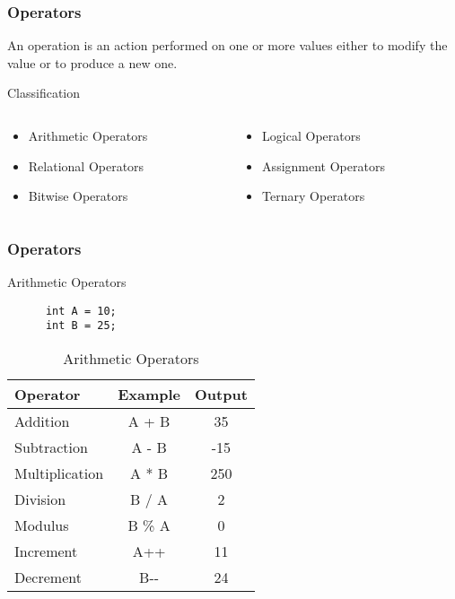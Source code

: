 \documentclass[10pt, compress]{beamer}
\begin{document}
\begin{frame}[fragile]
  \frametitle{Operators}
  An operation is an action performed on one or more values either to modify the value or to produce a new one.
  \begin{block}{Classification}
    \begin{columns}
      \begin{column}{0.5\textwidth}
        \begin{itemize}
          \item[] Arithmetic Operators
          \item[] Relational Operators
          \item[] Bitwise Operators
        \end{itemize}
      \end{column}
      \begin{column}{0.5\textwidth}
        \begin{itemize}
          \item[] Logical Operators
          \item[] Assignment Operators
          \item[] Ternary Operators
        \end{itemize}
      \end{column}
    \end{columns}
  \end{block}
\end{frame}

\begin{frame}[fragile]
  \frametitle{Operators}
  \begin{block}{Arithmetic Operators}
    \begin{verbatim}
      int A = 10;
      int B = 25;
    \end{verbatim}
    \begin{table}
      \begin{tabular}{lcc}
        \toprule
        Operator & Example & Output\\
        \midrule
        Addition & A + B & 35 \\
        Subtraction & A - B & -15\\
        Multiplication & A * B & 250\\
        Division & B / A & 2\\
        Modulus & B \% A & 0\\
        Increment & A++ & 11\\
        Decrement & B-{}- & 24\\
        \bottomrule
      \end{tabular}
      \caption{Arithmetic Operators}
    \end{table}
  \end{block}
\end{frame}
\end{document}
